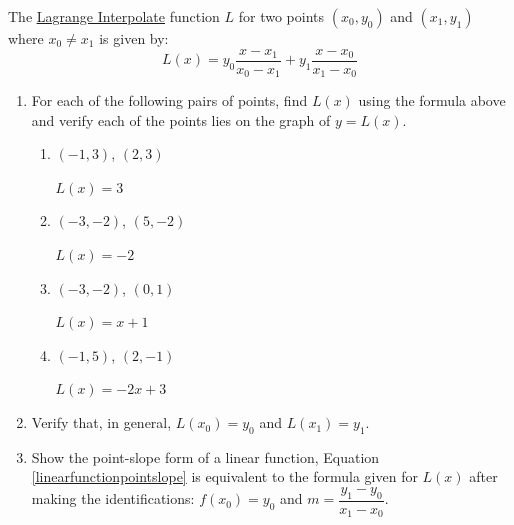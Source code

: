 \documentclass{ximera}
\begin{document}
\begin{problem}\label{LagrangeLinearExercise}
The \href{https://en.wikipedia.org/wiki/Lagrange_polynomial}{\underline{Lagrange Interpolate}} function $L$ for two points $(x_{0}, y_{0})$ and $(x_{1}, y_{1})$ where $x_{0} \neq x_{1}$  is given by: \[L(x) = y_{0}  \dfrac{x - x_{1}}{x_{0} - x_{1}}+ y_{1}\dfrac{x - x_{0}}{x_{1} - x_{0}}\]

\begin{enumerate}

\item For each of the following pairs of points,  find  $L(x)$ using the formula above and verify each of the points lies on the graph of $y = L(x)$.



\begin{enumerate}

\item  $(-1,3)$, $(2,3)$

\begin{solution}
$L(x) = 3$
\end{solution}

\item  $(-3,-2)$,  $(5,-2)$

\begin{solution}
$L(x) = -2$
\end{solution}

\item  $(-3,-2)$, $(0,1)$

\begin{solution}
$L(x) = x+1$
\end{solution}

\item  $(-1,5)$, $(2,-1)$

\begin{solution}
$L(x) = -2x+3$
\end{solution}

\end{enumerate}

\item  Verify that, in general, $L(x_{0}) = y_{0}$ and $L(x_{1}) = y_{1}$.

\item  Show the point-slope form of a linear function, Equation \ref{linearfunctionpointslope} is equivalent to the formula given for $L(x)$ after making the identifications:  $f(x_{0}) = y_{0}$ and $m = \dfrac{y_{1} - y_{0}}{x_{1} - x_{0}}$.

\end{enumerate}
\end{problem}
\end{document}
